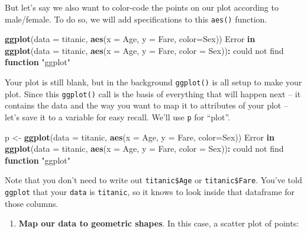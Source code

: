 \documentclass[
]{book}
\newenvironment{Shaded}{\begin{snugshade}}{\end{snugshade}}
\newcommand{\AttributeTok}[1]{\textcolor[rgb]{0.13,0.29,0.53}{#1}}
\newcommand{\ControlFlowTok}[1]{\textcolor[rgb]{0.13,0.29,0.53}{\textbf{#1}}}
\newcommand{\FunctionTok}[1]{\textcolor[rgb]{0.13,0.29,0.53}{\textbf{#1}}}
\newcommand{\NormalTok}[1]{#1}
\newcommand{\OtherTok}[1]{\textcolor[rgb]{0.56,0.35,0.01}{#1}}
\newcommand{\SpecialCharTok}[1]{\textcolor[rgb]{0.81,0.36,0.00}{\textbf{#1}}}
\newcommand{\StringTok}[1]{\textcolor[rgb]{0.31,0.60,0.02}{#1}}
\providecommand{\tightlist}{%
  \setlength{\itemsep}{0pt}\setlength{\parskip}{0pt}}
\begin{document}
But let's say we also want to color-code the points on our plot according to male/female. To do so, we will add specifications to this \texttt{aes()} function.

\begin{Shaded}
\begin{Highlighting}[]
\FunctionTok{ggplot}\NormalTok{(}\AttributeTok{data =}\NormalTok{ titanic, }
       \FunctionTok{aes}\NormalTok{(}\AttributeTok{x =}\NormalTok{ Age, }\AttributeTok{y =}\NormalTok{ Fare, }\AttributeTok{color=}\NormalTok{Sex))}
\NormalTok{Error }\ControlFlowTok{in} \FunctionTok{ggplot}\NormalTok{(}\AttributeTok{data =}\NormalTok{ titanic, }\FunctionTok{aes}\NormalTok{(}\AttributeTok{x =}\NormalTok{ Age, }\AttributeTok{y =}\NormalTok{ Fare, }\AttributeTok{color =}\NormalTok{ Sex))}\SpecialCharTok{:}\NormalTok{ could not find }\ControlFlowTok{function} \StringTok{"ggplot"}
\end{Highlighting}
\end{Shaded}

Your plot is still blank, but in the background \texttt{ggplot()} is all setup to make your plot. Since this \texttt{ggplot()} call is the basis of everything that will happen next -- it contains the data and the way you want to map it to attributes of your plot -- let's save it to a variable for easy recall. We'll use \texttt{p} for ``plot''.

\begin{Shaded}
\begin{Highlighting}[]
\NormalTok{p }\OtherTok{\textless{}{-}} \FunctionTok{ggplot}\NormalTok{(}\AttributeTok{data =}\NormalTok{ titanic, }
       \FunctionTok{aes}\NormalTok{(}\AttributeTok{x =}\NormalTok{ Age, }\AttributeTok{y =}\NormalTok{ Fare, }\AttributeTok{color=}\NormalTok{Sex))}
\NormalTok{Error }\ControlFlowTok{in} \FunctionTok{ggplot}\NormalTok{(}\AttributeTok{data =}\NormalTok{ titanic, }\FunctionTok{aes}\NormalTok{(}\AttributeTok{x =}\NormalTok{ Age, }\AttributeTok{y =}\NormalTok{ Fare, }\AttributeTok{color =}\NormalTok{ Sex))}\SpecialCharTok{:}\NormalTok{ could not find }\ControlFlowTok{function} \StringTok{"ggplot"}
\end{Highlighting}
\end{Shaded}

Note that you don't need to write out \texttt{titanic\$Age} or \texttt{titanic\$Fare}. You've told \texttt{ggplot} that your \texttt{data} is \texttt{titanic}, so it knows to look inside that dataframe for those columns.

\begin{enumerate}
\def\labelenumi{(\arabic{enumi})}
\setcounter{enumi}{3}
\tightlist
\item
  \textbf{Map our data to geometric shapes}. In this case, a scatter plot of points:
\end{enumerate}
\end{document}
